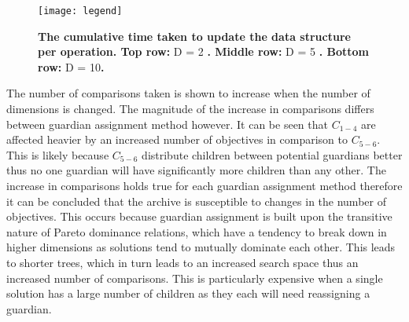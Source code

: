 \documentclass{ecmm427_assignment}
\begin{document}
\begin{figure}[h]
    \centering
    \texttt{[image: legend]}
    \caption{\textbf{The cumulative time taken to update the data structure per operation. Top row:} D = 2 \textbf{. Middle row:} D = 5 \textbf{. Bottom row:} D = 10\textbf{.}}
    \label{fig:timings_dimensions}
\end{figure}

The number of comparisons taken is shown to increase when the number of dimensions is changed. The magnitude of the increase in comparisons differs between guardian assignment method however. It can be seen that $C_{1-4}$ are affected heavier by an increased number of objectives in comparison to $C_{5-6}$. This is likely because $C_{5-6}$ distribute children between potential guardians better thus no one guardian will have significantly more children than any other. The increase in comparisons holds true for each guardian assignment method therefore it can be concluded that the archive is susceptible to changes in the number of objectives. This occurs because guardian assignment is built upon the transitive nature of Pareto dominance relations, which have a tendency to break down in higher dimensions as solutions tend to mutually dominate each other. This leads to shorter trees, which in turn leads to an increased search space thus an increased number of comparisons. This is particularly expensive when a single solution has a large number of children as they each will need reassigning a guardian.
\end{document}
